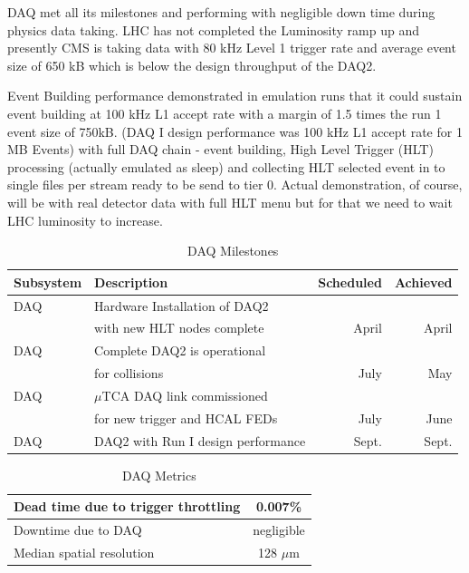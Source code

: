 DAQ met all its milestones and performing with negligible down time during physics data taking. LHC has not completed the Luminosity ramp up and presently CMS is taking data with 80 kHz Level 1 trigger rate and average event size of 650 kB which is below the design throughput of the DAQ2. 

Event Building performance demonstrated in emulation runs that it could sustain event building at 100 kHz L1 accept rate with a margin of 1.5 times the run 1 event size of 750kB. (DAQ I design performance was 100 kHz L1 accept rate for 1 MB Events) with full DAQ chain - event building, High Level Trigger  (HLT) processing (actually emulated as sleep) and collecting HLT selected event in to single files per stream ready to be send to tier 0. Actual demonstration, of course, will be with real detector data with full HLT menu but for that we need to wait LHC luminosity to increase. 

\begin{table}[h]
\caption{DAQ Milestones}
\begin{center}
\begin{tabular}{|l|l|r|r|}
\hline
Subsystem&Description&Scheduled&Achieved\\
\hline
DAQ& Hardware Installation of DAQ2& & \\
& with new HLT nodes complete& April & April \\
\hline
DAQ& Complete DAQ2 is operational && \\
&for collisions& July &   May\\
\hline
DAQ&$\mu$TCA DAQ link commissioned & & \\
&for new trigger and HCAL FEDs& July &  June \\
\hline
DAQ&DAQ2 with Run I design performance & Sept. &Sept. \\
\hline
\end{tabular}
\end{center}
\label{DAQMilestones}
\end{table}%

\begin{table}[htp]
\caption{DAQ Metrics}
\begin{center}
\begin{tabular}{|l|c|}
\hline
 Dead time due to trigger throttling& 0.007\%  \\
\hline
Downtime due to DAQ& negligible\\
\hline
Median spatial resolution & 128 $\mu$m\\
\hline
\end{tabular}
\end{center}
\label{DAQMetrics}
\end{table}%


